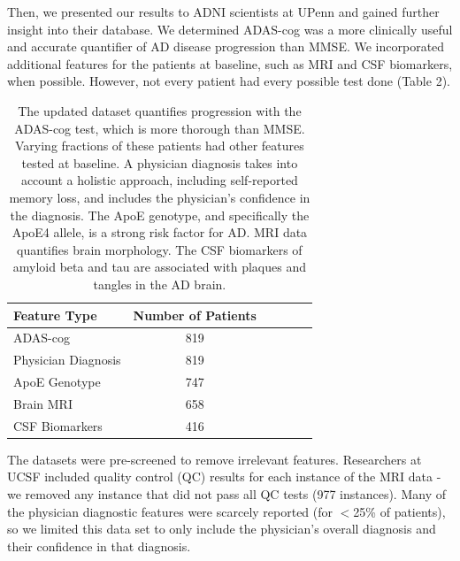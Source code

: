 \documentclass{article}
\begin{document}
Then, we presented our results to ADNI scientists at UPenn and gained further insight into their database. We determined ADAS-cog was a more clinically useful and accurate quantifier of AD disease progression than MMSE.  We incorporated additional features for the patients at baseline, such as MRI and CSF biomarkers, when possible. However, not every patient had every possible test done (Table 2). 

\begin{flushleft}
\begin{table}[h]
\caption{The updated dataset quantifies progression with the ADAS-cog test, which is more thorough than MMSE. Varying fractions of these patients had other features tested at baseline. A physician diagnosis takes into account a holistic approach, including self-reported memory loss, and includes the physician's confidence in the diagnosis. The ApoE genotype, and specifically the ApoE4 allele, is a strong risk factor for AD. MRI data quantifies brain morphology. The CSF biomarkers of amyloid beta and tau are associated with plaques and tangles in the AD brain.}
\label{sample-table}
\vskip 0.15in
\begin{center}
\begin{small}
\begin{sc}
\begin{tabular}{lccccr}
\hline
\abovespace
\belowspace
Feature Type & Number of Patients \\
\hline
\abovespace
\belowspace
ADAS-cog    & 819 \\
\belowspace
Physician Diagnosis    &  819  \\
\belowspace
ApoE Genotype & 747  \\
\belowspace
Brain MRI    &  658 \\
\belowspace
CSF Biomarkers    &  416  \\
\hline
\end{tabular}
\end{sc}
\end{small}
\end{center}
\vskip -0.1in
\end{table}

\end{flushleft}

The datasets were pre-screened to remove irrelevant features. Researchers at UCSF included quality control (QC) results for each instance of the MRI data - we removed any instance that did not pass all QC tests (977 instances). Many of the physician diagnostic features were scarcely reported (for $<$25\% of patients), so we limited this data set to only include the physician's overall diagnosis and their confidence in that diagnosis.\\
\end{document}
